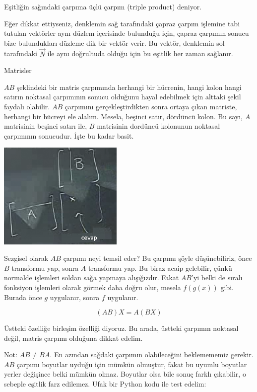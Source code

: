 \documentclass[12pt,fleqn]{article}\usepackage{../../common}
\begin{document}
Eşitliğin sağındaki çarpıma üçlü çarpım (triple product) deniyor.

Eğer dikkat ettiyseniz, denklemin sağ tarafındaki çapraz çarpım işlemine tabi
tutulan vektörler aynı düzlem içerisinde bulunduğu için, çapraz çarpımın sonucu
bize bulundukları düzleme dik bir vektör verir. Bu vektör, denklemin sol
tarafındaki $\vec{N}$ ile aynı doğrultuda olduğu için bu eşitlik her zaman
sağlanır.


Matrisler

$AB$ şeklindeki bir matris çarpımında herhangi bir hücrenin, hangi kolon hangi
satırın noktasal çarpımının sonucu olduğunu hayal edebilmek için alttaki şekil
faydalı olabilir. $AB$ çarpımını gerçekleştirdikten sonra ortaya çıkan matriste,
herhangi bir hücreyi ele alalım. Mesela, beşinci satır, dördüncü kolon. Bu sayı,
$A$ matrisinin beşinci satırı ile, $B$ matrisinin dordüncü kolonunun noktasal
çarpımının sonucudur. İşte bu kadar basit.

\begin{center}
\includegraphics[width=6cm]{3_4.png}
\end{center}

Sezgisel olarak $AB$ çarpımı neyi temsil eder? Bu çarpımı şöyle düşünebiliriz,
önce $B$ transformu yap, sonra $A$ transformu yap. Bu biraz acaip gelebilir,
çünkü normalde işlemleri soldan sağa yapmaya alışığızdır. Fakat $AB$'yi belki de
sıralı fonksiyon işlemleri olarak görmek daha doğru olur, mesela $f(g(x))$
gibi. Burada önce $g$ uygulanır, sonra $f$ uygulanır.

$$ (AB)X = A(BX) $$

Üstteki özelliğe birleşim özelliği diyoruz. Bu arada, üstteki çarpımın noktasal
değil, matris çarpımı olduğuna dikkat edelim.

Not: $AB \ne BA$. En azından sağdaki çarpımın olabileceğini beklemememiz
gerekir. $AB$ çarpımı boyutlar uyduğu için mümkün olmuştur, fakat bu uyumlu
boyutlar yerler değişince belki mümkün olmaz. Boyutlar olsa bile sonuç farklı
çıkabilir, o sebeple eşitlik farz edilemez. Ufak bir Python kodu ile test
edelim:
\end{document}
